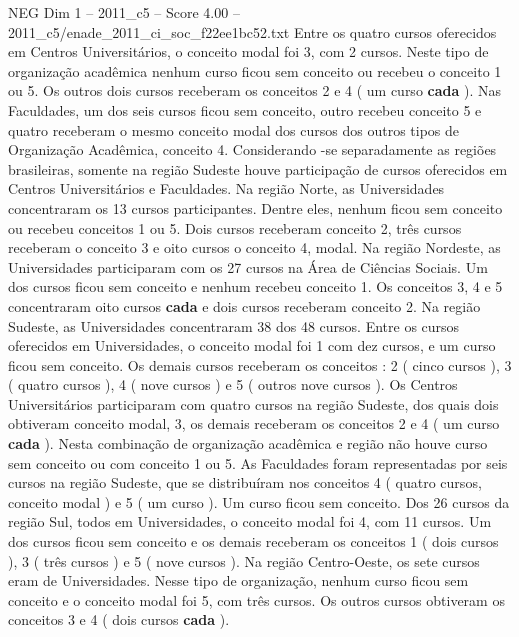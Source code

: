\begin{textsample}{NEG Dim 1 – 2011\_c5 – Score 4.00 – 2011\_c5/enade\_2011\_ci\_soc\_f22ee1bc52.txt}
Entre os quatro cursos oferecidos em Centros Universitários, o conceito modal foi 3, com 2 cursos.
Neste tipo de organização acadêmica nenhum curso ficou sem conceito ou recebeu o conceito 1 ou 5.
Os outros dois cursos receberam os conceitos 2 e 4 ( um curso \textbf{cada} ).
Nas Faculdades, um dos seis cursos ficou sem conceito, outro recebeu conceito 5 e quatro receberam o mesmo conceito modal dos cursos dos outros tipos de Organização Acadêmica, conceito 4.
Considerando -se separadamente as regiões brasileiras, somente na região Sudeste houve participação de cursos oferecidos em Centros Universitários e Faculdades.
Na região Norte, as Universidades concentraram os 13 cursos participantes.
Dentre eles, nenhum ficou sem conceito ou recebeu conceitos 1 ou 5.
Dois cursos receberam conceito 2, três cursos receberam o conceito 3 e oito cursos o conceito 4, modal.
Na região Nordeste, as Universidades participaram com os 27 cursos na Área de Ciências Sociais.
Um dos cursos ficou sem conceito e nenhum recebeu conceito 1.
Os conceitos 3, 4 e 5 concentraram oito cursos \textbf{cada} e dois cursos receberam conceito 2.
Na região Sudeste, as Universidades concentraram 38 dos 48 cursos.
Entre os cursos oferecidos em Universidades, o conceito modal foi 1 com dez cursos, e um curso ficou sem conceito.
Os demais cursos receberam os conceitos : 2 ( cinco cursos ), 3 ( quatro cursos ), 4 ( nove cursos ) e 5 ( outros nove cursos ).
Os Centros Universitários participaram com quatro cursos na região Sudeste, dos quais dois obtiveram conceito modal, 3, os demais receberam os conceitos 2 e 4 ( um curso \textbf{cada} ).
Nesta combinação de organização acadêmica e região não houve curso sem conceito ou com conceito 1 ou 5.
As Faculdades foram representadas por seis cursos na região Sudeste, que se distribuíram nos conceitos 4 ( quatro cursos, conceito modal ) e 5 ( um curso ).
Um curso ficou sem conceito.
Dos 26 cursos da região Sul, todos em Universidades, o conceito modal foi 4, com 11 cursos.
Um dos cursos ficou sem conceito e os demais receberam os conceitos 1 ( dois cursos ), 3 ( três cursos ) e 5 ( nove cursos ).
Na região Centro-Oeste, os sete cursos eram de Universidades.
Nesse tipo de organização, nenhum curso ficou sem conceito e o conceito modal foi 5, com três cursos.
Os outros cursos obtiveram os conceitos 3 e 4 ( dois cursos \textbf{cada} ).

\end{textsample}
